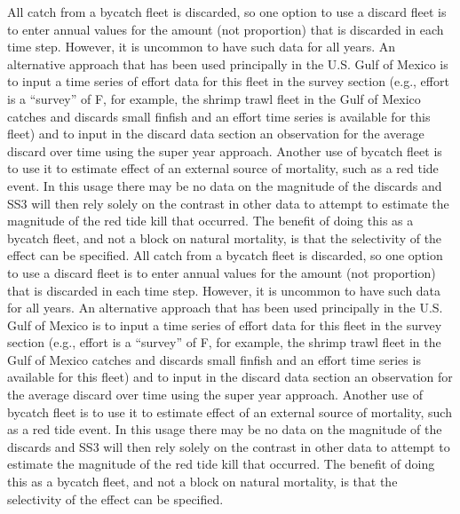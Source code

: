 All catch from a bycatch fleet is discarded, so one option to use a discard fleet is to enter annual values for the amount (not proportion) that is discarded in each time step. However, it is uncommon to have such data for all years. An alternative approach that has been used principally in the U.S. Gulf of Mexico is to input a time series of effort data for this fleet in the survey section (e.g.,  effort is a ``survey'' of F, for example, the shrimp trawl fleet in the Gulf of Mexico catches and discards small finfish and an effort time series is available for this fleet) and to input in the discard data section an observation for the average discard over time using the super year approach. Another use of bycatch fleet is to use it to estimate effect of an external source of mortality, such as a red tide event. In this usage there may be no data on the magnitude of the discards and SS3 will then rely solely on the contrast in other data to attempt to estimate the magnitude of the red tide kill that occurred. The benefit of doing this as a bycatch fleet, and not a block on natural mortality, is that the selectivity of the effect can be specified. 
All catch from a bycatch fleet is discarded, so one option to use a discard fleet is to enter annual values for the amount (not proportion) that is discarded in each time step. However, it is uncommon to have such data for all years. An alternative approach that has been used principally in the U.S. Gulf of Mexico is to input a time series of effort data for this fleet in the survey section (e.g.,  effort is a ``survey'' of F, for example, the shrimp trawl fleet in the Gulf of Mexico catches and discards small finfish and an effort time series is available for this fleet) and to input in the discard data section an observation for the average discard over time using the super year approach. Another use of bycatch fleet is to use it to estimate effect of an external source of mortality, such as a red tide event. In this usage there may be no data on the magnitude of the discards and SS3 will then rely solely on the contrast in other data to attempt to estimate the magnitude of the red tide kill that occurred. The benefit of doing this as a bycatch fleet, and not a block on natural mortality, is that the selectivity of the effect can be specified. 

